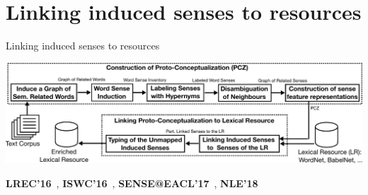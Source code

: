 \section{Linking induced senses to resources}

\begin{frame}{ Linking induced senses to resources }
	
\includegraphics[width=1.05\textwidth]{figures/linking-outline}
\vspace{2em}

\textbf{LREC'16}~\cite{panchenko2016best}, \textbf{ISWC'16}~\cite{faralli2016linked}, \textbf{SENSE@EACL'17}~\cite{panchenko-EtAl:2017:SENSE2017}, \textbf{NLE'18}~\cite{biemann2018framework}

\end{frame}

